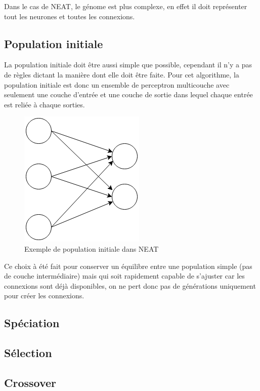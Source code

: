 \documentclass{article}
\begin{document}
Dans le cas de NEAT, le génome est plus complexe, en effet il doit représenter tout les neurones et toutes les connexions. 

\subsection{Population initiale}

La population initiale doit être aussi simple que possible, cependant il n'y a pas de règles dictant la manière dont elle doit être faite. Pour cet algorithme, la population initiale est donc un ensemble de perceptron multicouche avec seulement une couche d'entrée et une couche de sortie dans lequel chaque entrée est reliée à chaque sorties.

\begin{figure}[h]
\begin{center}
	\includegraphics[scale=0.6]{initneat.png}
	\caption{Exemple de population initiale dans NEAT}
\end{center}
\end{figure}

Ce choix à été fait pour conserver un équilibre entre une population simple (pas de couche intermédiaire) mais qui soit rapidement capable de s'ajuster car les connexions sont déjà disponibles, on ne pert donc pas de générations uniquement pour créer les connexions.

\subsection{Spéciation}

\subsection{Sélection}


\subsection{Crossover}
\end{document}
